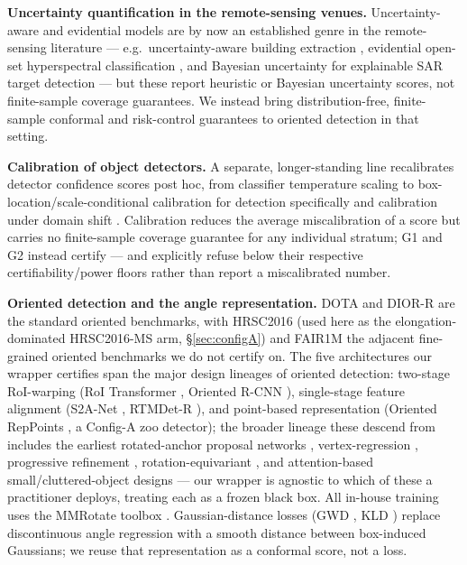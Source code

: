 \documentclass[journal]{IEEEtran}
\begin{document}
\textbf{Uncertainty quantification in the remote-sensing venues.} Uncertainty-aware and evidential models are
by now an established genre in the remote-sensing literature --- e.g.\ uncertainty-aware building extraction
\citep{uanet2024}, evidential open-set hyperspectral classification \citep{ssel2024}, and Bayesian
uncertainty for explainable SAR target detection \citep{huang2023sarunc} --- but these report
heuristic or Bayesian uncertainty scores, not finite-sample coverage guarantees. We instead bring
distribution-free, finite-sample conformal and risk-control guarantees to oriented detection in that setting.

\textbf{Calibration of object detectors.} A separate, longer-standing line recalibrates detector confidence
scores post hoc, from classifier temperature scaling \citep{guo2017calibration} to box-location/scale-conditional
calibration for detection specifically \citep{kuppers2020multivariate} and calibration under domain shift
\citep{munir2022calibration}. Calibration reduces the average miscalibration of a score but carries no
finite-sample coverage guarantee for any individual stratum; G1 and G2 instead certify --- and explicitly
refuse below their respective certifiability/power floors rather than report a miscalibrated number.

\textbf{Oriented detection and the angle representation.} DOTA \citep{xia2018dota,ding2021dotabench} and
DIOR-R \citep{cheng2022diorr} are the standard oriented benchmarks, with HRSC2016 \citep{liu2017hrsc2016}
(used here as the elongation-dominated HRSC2016-MS arm, \S\ref{sec:configA}) and FAIR1M \citep{sun2022fair1m}
the adjacent fine-grained oriented benchmarks we do not certify on. The five architectures our wrapper
certifies span the major design lineages of oriented detection: two-stage RoI-warping (RoI Transformer
\citep{ding2019roitrans}, Oriented R-CNN \citep{xie2021orcnn}), single-stage feature alignment (S2A-Net
\citep{han2022s2anet}, RTMDet-R \citep{lyu2022rtmdet}), and point-based representation (Oriented RepPoints
\citep{li2022reppoints}, a Config-A zoo detector); the broader lineage these descend from includes the
earliest rotated-anchor proposal networks \citep{ma2018rrpn}, vertex-regression \citep{xu2021glidingvertex},
progressive refinement \citep{yang2021r3det}, rotation-equivariant \citep{han2021redet}, and attention-based
small/cluttered-object \citep{yang2019scrdet} designs --- our wrapper is agnostic to which of these a
practitioner deploys, treating each as a frozen black box. All in-house training uses the MMRotate toolbox
\citep{zhou2022mmrotate}. Gaussian-distance losses (GWD \citep{yang2021gwd}, KLD \citep{yang2021kld}) replace
discontinuous angle regression with a smooth distance between box-induced Gaussians; we reuse that
representation as a conformal score, not a loss.
\end{document}

